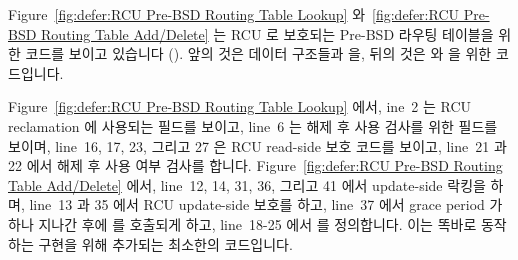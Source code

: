 Figure~\ref{fig:defer:RCU Pre-BSD Routing Table Lookup}
와~\ref{fig:defer:RCU Pre-BSD Routing Table Add/Delete}
는 RCU 로 보호되는 Pre-BSD 라우팅 테이블을 위한 코드를 보이고 있습니다
().
앞의 것은 데이터 구조들과  을, 뒤의 것은  와
 을 위한 코드입니다.

Figure~\ref{fig:defer:RCU Pre-BSD Routing Table Lookup} 에서, ine~2 는 RCU
reclamation 에 사용되는  필드를 보이고, line~6 는 해제 후 사용 검사를
위한  필드를 보이며, line~16, 17, 23, 그리고 27 은 RCU read-side
보호 코드를 보이고, line~21 과 22 에서 해제 후 사용 여부 검사를 합니다.
Figure~\ref{fig:defer:RCU Pre-BSD Routing Table Add/Delete} 에서, line~12, 14,
31, 36, 그리고 41 에서 update-side 락킹을 하며, line~13 과 35 에서 RCU
update-side 보호를 하고, line~37 에서 grace period 가 하나 지나간 후에
 를 호출되게 하고, line~18-25 에서  를
정의합니다.
이는 똑바로 동작하는 구현을 위해 추가되는 최소한의 코드입니다.

